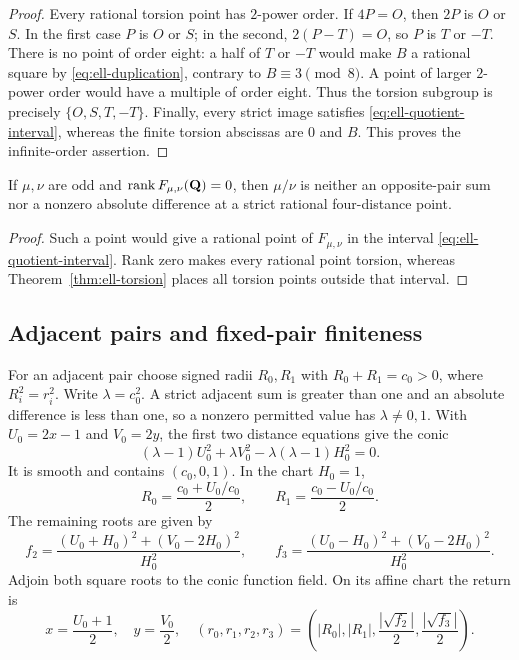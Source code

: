 \begin{proof}
Every rational torsion point has $2$-power order. If $4P=O$, then
$2P$ is $O$ or $S$. In the first case $P$ is $O$ or $S$; in the
second, $2(P-T)=O$, so $P$ is $T$ or $-T$.
There is no point of order eight: a half of $T$ or $-T$ would make
$B$ a rational square by \eqref{eq:ell-duplication}, contrary to
$B\equiv3\pmod8$. A point of larger $2$-power order would have a
multiple of order eight. Thus the torsion subgroup is precisely
$\{O,S,T,-T\}$.
Finally, every strict image satisfies
\eqref{eq:ell-quotient-interval}, whereas the finite torsion abscissas
are $0$ and $B$. This proves the infinite-order assertion.
\end{proof}

\begin{corollary}\label{cor:ell-rank-zero}
If $\mu,\nu$ are odd and $\operatorname{rank} F_{\mu,\nu}(\mathbf Q)=0$, then
$\mu/\nu$ is neither an opposite-pair sum nor a nonzero absolute
difference at a strict rational four-distance point.
\end{corollary}
\begin{proof}
Such a point would give a rational point of $F_{\mu,\nu}$ in the interval
\eqref{eq:ell-quotient-interval}. Rank zero makes every rational point
torsion, whereas Theorem~\ref{thm:ell-torsion} places all torsion points
outside that interval.
\end{proof}

\subsection{Adjacent pairs and fixed-pair finiteness}

For an adjacent pair choose signed radii $R_0,R_1$ with
$R_0+R_1=c_0>0$, where $R_i^2=r_i^2$.  Write $\lambda=c_0^2$.
A strict adjacent sum is greater than one and an absolute difference
is less than one, so a nonzero permitted value has
$\lambda\ne0,1$.
With $U_0=2x-1$ and $V_0=2y$, the first two distance equations
give the conic
\begin{equation}\label{eq:ell-adjacent-conic}
 (\lambda-1)U_0^2+\lambda V_0^2
       -\lambda(\lambda-1)H_0^2=0.
\end{equation}
It is smooth and contains $(c_0,0,1)$.  In the chart $H_0=1$,
\[
 R_0=\frac{c_0+U_0/c_0}{2},\qquad
 R_1=\frac{c_0-U_0/c_0}{2}.
\]
The remaining roots are given by
\[
 f_2=\frac{(U_0+H_0)^2+(V_0-2H_0)^2}{H_0^2},\qquad
 f_3=\frac{(U_0-H_0)^2+(V_0-2H_0)^2}{H_0^2}.
\]
Adjoin both square roots to the conic function field.  On its affine
chart the return is
\[
 x=\frac{U_0+1}{2},\quad y=\frac{V_0}{2},\quad
 (r_0,r_1,r_2,r_3)
 =\left(|R_0|,|R_1|,\frac{|\sqrt{f_2}|}{2},
                           \frac{|\sqrt{f_3}|}{2}\right).
\]

